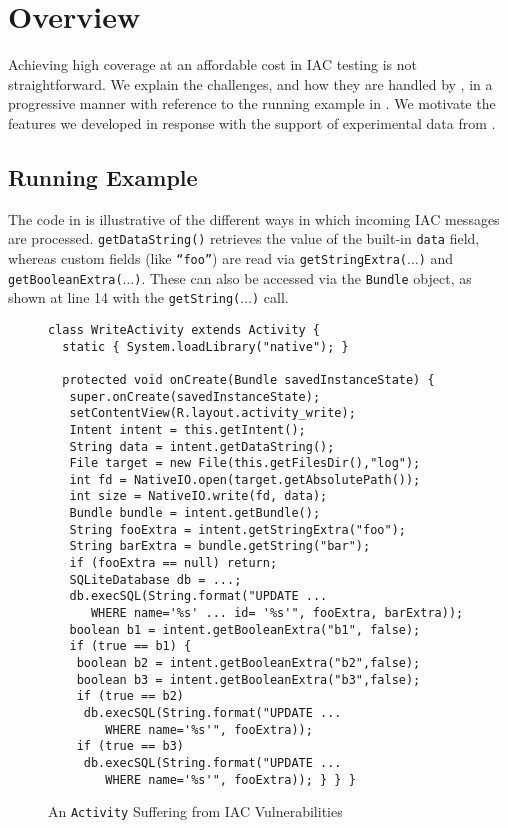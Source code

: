 \section{Overview}

Achieving high coverage at an affordable cost in IAC testing is not straightforward. We explain the challenges, and how they are handled by \Tool, in a progressive manner with reference to the running example in . We motivate the features we developed in response with the support of experimental data from .

\subsection{Running Example}

The code in  is illustrative of the different ways in which incoming IAC messages are processed. {\tt getDataString()} retrieves the value of the built-in {\tt data} field, whereas custom fields (like {\tt ``foo''}) are read via {\tt getStringExtra($\ldots$)} and {\tt getBooleanExtra($\ldots$)}. These can also be accessed via the {\tt Bundle} object, as shown at line 14 with the {\tt getString($\ldots$)} call.

\begin{figure}
	\begin{lstlisting}[showstringspaces=false]
class WriteActivity extends Activity {
  static { System.loadLibrary("native"); }

  protected void onCreate(Bundle savedInstanceState) {
   super.onCreate(savedInstanceState);
   setContentView(R.layout.activity_write);
   Intent intent = this.getIntent();
   String data = intent.getDataString();	
   File target = new File(this.getFilesDir(),"log");
   int fd = NativeIO.open(target.getAbsolutePath());	
   int size = NativeIO.write(fd, data);		 
   Bundle bundle = intent.getBundle();
   String fooExtra = intent.getStringExtra("foo");
   String barExtra = bundle.getString("bar");		
   if (fooExtra == null) return;	
   SQLiteDatabase db = ...;
   db.execSQL(String.format("UPDATE ... 
      WHERE name='%s' ... id= '%s'", fooExtra, barExtra));	
   boolean b1 = intent.getBooleanExtra("b1", false);
   if (true == b1) {
    boolean b2 = intent.getBooleanExtra("b2",false);
    boolean b3 = intent.getBooleanExtra("b3",false);
    if (true == b2)
     db.execSQL(String.format("UPDATE ... 
        WHERE name='%s'", fooExtra));
    if (true == b3)
     db.execSQL(String.format("UPDATE ... 
        WHERE name='%s'", fooExtra)); } } }
	\end{lstlisting}
	\caption{\label{Fi:techExample}An \texttt{Activity} Suffering from IAC Vulnerabilities}
\end{figure}

